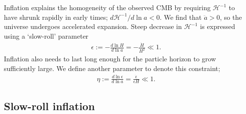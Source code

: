 Inflation explains the homogeneity of the observed CMB by requiring $\mathcal{H}^{-1}$ to have shrunk rapidly in early times; $d\mathcal{H}^{-1}/d\ln a < 0$. We find that $\ddot{a} > 0$, so the universe undergoes accelerated expansion. Steep decrease in $\mathcal{H}^{-1}$ is expressed using a `slow-roll' parameter
\begin{align}
	\epsilon := - \frac{d\ln H}{d\ln a} = -\frac{\dot{H}}{H^2} \ll 1. \label{def:slow_roll_epsilon}
\end{align}
Inflation also needs to last long enough for the particle horizon to grow sufficiently large. We define another parameter to denote this constraint;
\begin{align}
	\eta := \frac{d\ln \epsilon}{d\ln a} = \frac{\dot{\epsilon}}{\epsilon H} \ll 1. \label{def:slow_roll_eta}
\end{align}


\subsection{Slow-roll inflation}
\label{section:slow-roll_inflation}

